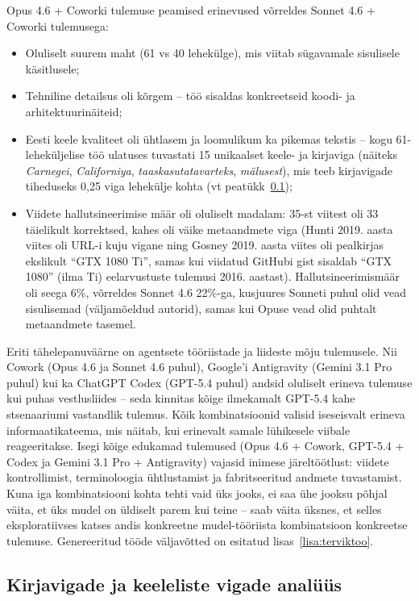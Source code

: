 Opus 4.6 + Coworki tulemuse peamised erinevused võrreldes Sonnet 4.6 + Coworki tulemusega:
\begin{itemize}
    \item Oluliselt suurem maht (61 vs 40 lehekülge), mis viitab sügavamale sisulisele käsitlusele;
    \item Tehniline detailsus oli kõrgem -- töö sisaldas konkreetseid koodi- ja arhitektuurinäiteid;
    \item Eesti keele kvaliteet oli ühtlasem ja loomulikum ka pikemas tekstis -- kogu 61-leheküljelise töö ulatuses tuvastati 15 unikaalset keele- ja kirjaviga (näiteks \textit{Carnegei}, \textit{Californiya}, \textit{taaskasutatavarteks}, \textit{mälusest}), mis teeb kirjavigade tiheduseks 0,25 viga lehekülje kohta (vt peatükk~\ref{subsec:kirjaviga});
    \item Viidete hallutsineerimise määr oli oluliselt madalam: 35-st viitest oli 33 täielikult korrektsed, kahes oli väike metaandmete viga (Hunti 2019. aasta viites oli URL-i kuju vigane ning Gosney 2019. aasta viites oli pealkirjas ekslikult ``GTX 1080 Ti'', samas kui viidatud GitHubi gist sisaldab ``GTX 1080'' (ilma Ti) eelarvustuste tulemusi 2016. aastast). Hallutsineerimismäär oli seega 6\%, võrreldes Sonnet 4.6 22\%-ga, kusjuures Sonneti puhul olid vead sisulisemad (väljamõeldud autorid), samas kui Opuse vead olid puhtalt metaandmete tasemel.
\end{itemize}

Eriti tähelepanuväärne on agentsete tööriistade ja liideste mõju tulemusele. Nii Cowork (Opus 4.6 ja Sonnet 4.6 puhul), Google'i Antigravity (Gemini 3.1 Pro puhul) kui ka ChatGPT Codex (GPT-5.4 puhul) andsid oluliselt erineva tulemuse kui puhas vestlusliides -- seda kinnitas kõige ilmekamalt GPT-5.4 kahe stsenaariumi vastandlik tulemus. Kõik kombinatsioonid valisid iseseisvalt erineva informaatikateema, mis näitab, kui erinevalt samale lühikesele viibale reageeritakse. Isegi kõige edukamad tulemused (Opus 4.6 + Cowork, GPT-5.4 + Codex ja Gemini 3.1 Pro + Antigravity) vajasid inimese järeltöötlust: viidete kontrollimist, terminoloogia ühtlustamist ja fabritseeritud andmete tuvastamist. Kuna iga kombinatsiooni kohta tehti vaid üks jooks, ei saa ühe jooksu põhjal väita, et üks mudel on üldiselt parem kui teine -- saab väita üksnes, et selles eksploratiivses katses andis konkreetne mudel-tööriista kombinatsioon konkreetse tulemuse. Genereeritud tööde väljavõtted on esitatud lisas~\ref{lisa:terviktoo}.

\subsection{Kirjavigade ja keeleliste vigade analüüs} \label{subsec:kirjaviga}

